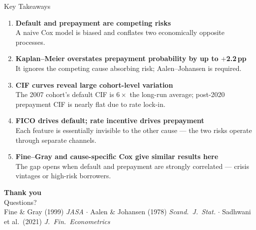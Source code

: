 \documentclass[10pt,aspectratio=169]{beamer}
\begin{document}
\begin{frame}{Key Takeaways}
    \begin{enumerate}\itemsep8pt
        \item \textbf{Default and prepayment are competing risks}\\
              \small A naive Cox model is biased and conflates two economically opposite processes.

        \item \textbf{Kaplan--Meier overstates prepayment probability by up to $+$2.2\,pp}\\
              \small It ignores the competing cause absorbing risk; Aalen--Johansen is required.

        \item \textbf{CIF curves reveal large cohort-level variation}\\
              \small The 2007 cohort's default CIF is $6\times$ the long-run average; post-2020 prepayment CIF is nearly flat due to rate lock-in.

        \item \textbf{FICO drives default; rate incentive drives prepayment}\\
              \small Each feature is essentially invisible to the other cause --- the two risks operate through separate channels.

        \item \textbf{Fine--Gray and cause-specific Cox give similar results here}\\
              \small The gap opens when default and prepayment are strongly correlated --- crisis vintages or high-risk borrowers.
    \end{enumerate}
\end{frame}

\begin{frame}[plain]
    \vspace*{2em}
    \begin{center}
        {\Huge \textbf{Thank you}}\\[1.5em]
        {\Large Questions?}\\[2.5em]
        \small
        Fine \& Gray (1999) \textit{JASA} $\cdot$
        Aalen \& Johansen (1978) \textit{Scand.\ J.\ Stat.} $\cdot$
        Sadhwani et al.\ (2021) \textit{J.\ Fin.\ Econometrics}
    \end{center}
\end{frame}
\end{document}
